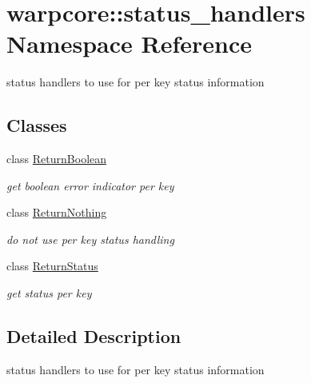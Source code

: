 \hypertarget{namespacewarpcore_1_1status__handlers}{}\section{warpcore\+:\+:status\+\_\+handlers Namespace Reference}
\label{namespacewarpcore_1_1status__handlers}


status handlers to use for per key status information  


\subsection*{Classes}
\begin{DoxyCompactItemize}
\item 
class \hyperlink{classwarpcore_1_1status__handlers_1_1ReturnBoolean}{Return\+Boolean}
\begin{DoxyCompactList}\small\item\em get boolean error indicator per key \end{DoxyCompactList}\item 
class \hyperlink{classwarpcore_1_1status__handlers_1_1ReturnNothing}{Return\+Nothing}
\begin{DoxyCompactList}\small\item\em do not use per key status handling \end{DoxyCompactList}\item 
class \hyperlink{classwarpcore_1_1status__handlers_1_1ReturnStatus}{Return\+Status}
\begin{DoxyCompactList}\small\item\em get status per key \end{DoxyCompactList}\end{DoxyCompactItemize}


\subsection{Detailed Description}
status handlers to use for per key status information 